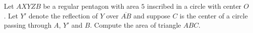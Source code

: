 Let $AXYZB$ be a regular pentagon with area $5$ inscribed in a circle with center $O$.  Let $Y'$ denote the reflection of $Y$ over $\overline{AB}$ and suppose $C$ is the center of a circle passing through $A$, $Y'$ and $B$. Compute the area of triangle $ABC$.
